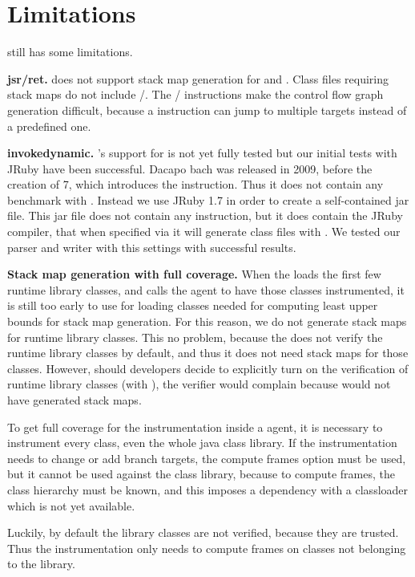 \section{Limitations}\label{sec:jnif-limitations}

\jnif{} still has some limitations.

\textbf{jsr/ret.} \jnif{} does not support stack map generation for  and .
Class files requiring stack maps do not include /.
The / instructions make the control flow graph generation difficult, because a  instruction can jump to multiple targets instead of a predefined one.

\textbf{invokedynamic.} \jnif{}'s support for  is not yet fully tested
but our initial tests with JRuby have been successful.
Dacapo bach was released in 2009,
before the creation of \java{} 7,
which introduces the  instruction.
Thus it does not contain any benchmark with .
Instead we use JRuby 1.7 in order to create a self-contained jar file. 
This jar file does not contain any  instruction, 
but it does contain the JRuby compiler, 
that when specified via  it will generate class files with . 
We tested our parser and writer with this settings with successful results.

\textbf{Stack map generation with full coverage.}
When the \jvm{} loads the first few runtime library classes,
and calls the \jvmti{} agent to have those classes instrumented,
it is still too early to use \jni{} for loading classes needed for computing least upper bounds for stack map generation.
For this reason, we do not generate stack maps for runtime library classes.
This no problem, because the \jvm{} does not verify the runtime library classes by default,
and thus it does not need stack maps for those classes.
However, should developers decide to explicitly turn on the verification of runtime library classes
(with ), the verifier would complain because \jnif{} would not have generated stack maps.

To get full coverage for the instrumentation inside a \jvmti{} agent, 
it is necessary to instrument every class, 
even the whole java class library.
If the instrumentation needs to change or add branch targets, 
the compute frames option must be used, 
but it cannot be used against the class library,
because to compute frames, 
the class hierarchy must be known,
and this imposes a dependency with a classloader which is not yet available.

Luckily, by default the \java{} library classes are not verified,
because they are trusted. 
Thus the instrumentation only needs to compute frames on classes not belonging to the \java{} library.
